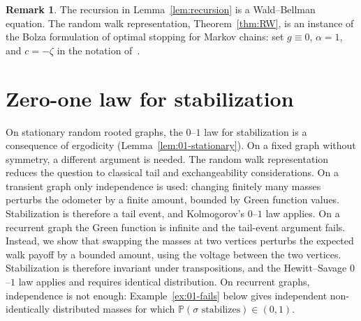 \documentclass[aop]{imsart}
\theoremstyle{plain}
\theoremstyle{definition}
\newtheorem{remark}[theorem]{Remark}
\renewcommand{\P}{\mathbb{P}}
\begin{document}
	\begin{remark}\label{rem:bolza}
		The recursion in Lemma~\ref{lem:recursion} is a Wald--Bellman equation. The random walk representation, Theorem~\ref{thm:RW}, is an instance of the Bolza formulation of optimal stopping for Markov chains: set $g\equiv 0$, $\alpha=1$, and $c=-\zeta$ in the notation of~\citep[Section~1.2, eqs.~(1.2.65) and~(1.2.73)]{PS06}.
	\end{remark}
	
	\section{Zero-one law for stabilization}\label{sec:01-law}
	On stationary random rooted graphs, the $0$--$1$ law for stabilization is a consequence of ergodicity (Lemma~\ref{lem:01-stationary}). On a fixed graph without symmetry, a different argument is needed. The random walk representation reduces the question to classical tail and exchangeability considerations. On a transient graph only independence is used: changing finitely many masses perturbs the odometer by a finite amount, bounded by Green function values. Stabilization is therefore a tail event, and Kolmogorov's $0$--$1$ law applies.  On a recurrent graph the Green function is infinite and the tail-event argument fails. Instead, we show that swapping the masses at two vertices perturbs the expected walk payoff by a bounded amount, using the voltage between the two vertices. Stabilization is therefore invariant under transpositions, and the Hewitt--Savage $0$--$1$ law applies and requires identical distribution. On recurrent graphs, independence is not enough: Example~\ref{ex:01-fails} below gives independent non-identically distributed masses for which $\P(\sigma\text{ stabilizes})\in(0,1)$.
	
\end{document}
